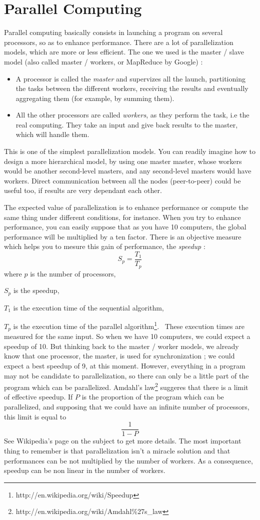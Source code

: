 \documentclass{report}
\begin{document}
\section{Parallel Computing}
Parallel computing basically consists in launching a program on several processors, so as to enhance performance. There
are a lot of parallelization models, which are more or less efficient. The one we used is the master / slave model (also
called master / workers, or MapReduce by Google) :
\begin{itemize}
\item A processor is called the \textit{master} and supervizes all the launch, partitioning the tasks between the
different workers, receiving the results and eventually aggregating them (for example, by summing them).
\item All the other processors are called \textit{workers}, as they perform the task, i.e the real computing. They take
an input and give back results to the master, which will handle them.
\end{itemize}
This is one of the simplest parallelization models. You can readily imagine how to design a more hierarchical model, by
using one master master, whose workers would be another second-level masters, and any second-level masters would have
workers. Direct communication between all the nodes (peer-to-peer) could be useful too, if results are very dependant
each other.

The expected value of parallelization is to enhance performance or compute the same thing under different conditions,
for instance. When you try to enhance performance, you can easily suppose that as you have 10 computers, the global
performance will be multiplied by a ten factor. There is an objective measure which helps you to mesure this gain of
performance, the \textit{speedup} :
\[ S_p = \frac{T_1}{T_p} \]
where $p$ is the number of processors, \

$S_p$ is the speedup, \

$T_1$ is the execution time of the sequential algorithm, \

$T_p$ is the execution time of the
parallel algorithm\footnote{http://en.wikipedia.org/wiki/Speedup}.
\
These execution times are measured for the same input. So when we have 10 computers, we could expect a speedup of 10.
But thinking back to the master / worker models, we already know that one processor, the master, is used for
synchronization ; we could expect a best speedup of 9, at this moment. However, everything in a program may not be
candidate to parallelization, so there can only be a little part of the program which can be parallelized. Amdahl's
law\footnote{http://en.wikipedia.org/wiki/Amdahl\%27s\_law} suggeres that there is a limit of effective speedup. If $P$
is the proportion of the program which can be parallelized, and supposing that we could have an infinite number of
processors, this limit is equal to
\[ \frac{1}{1-P} \]
See Wikipedia's page on the subject to get more details. The most important thing to remember is that parallelization
isn't a miracle solution and that performances can be not multiplied by the number of workers. As a consequence, speedup
can be non linear in the number of workers.
\end{document}
